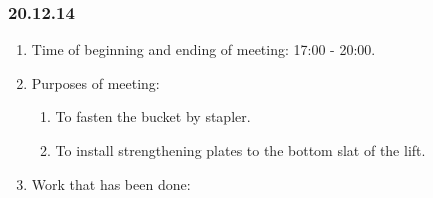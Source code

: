 \subsubsection{20.12.14}
\begin{enumerate}
	
	\item Time of beginning and ending of meeting: 17:00 - 20:00.
	
	\item Purposes of meeting: 
	\begin{enumerate}
		
		\item To fasten the bucket by stapler.
		
		\item To install strengthening plates to the bottom slat of the lift.
		
	\end{enumerate}
	\item Work that has been done:
	\begin{enumerate}
		

\end{enumerate}
\end{enumerate}
